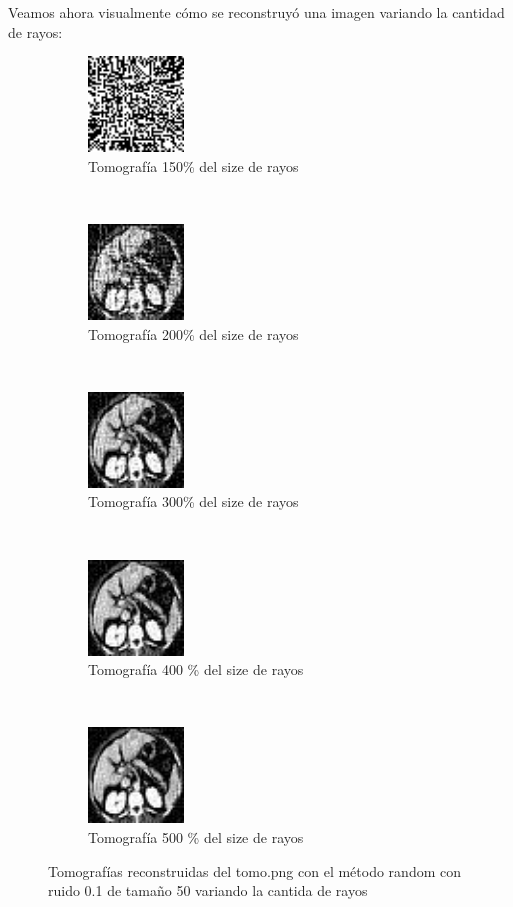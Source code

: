 Veamos ahora visualmente cómo se reconstruyó una imagen variando la cantidad de rayos:

\begin{figure}[H]
	\centering
    \begin{subfigure}[t]{0.3\textwidth}
        \centering
        \includegraphics[height=1.0in]{img/ray_n/1.png}
        \caption{Tomografía 150\% del size de rayos}
    \end{subfigure}
    ~ 
    \begin{subfigure}[t]{0.3\textwidth}
        \centering
        \includegraphics[height=1.0in]{img/ray_n/2.png}
        \caption{Tomografía 200\% del size de rayos}
	\label{tomo:2}
    \end{subfigure}
    ~ 
    \begin{subfigure}[t]{0.3\textwidth}
        \centering
        \includegraphics[height=1.0in]{img/ray_n/3.png}
        \caption{Tomografía 300\% del size de rayos}
    \end{subfigure}
    \\
    \begin{subfigure}[t]{0.3\textwidth}
        \centering
        \includegraphics[height=1.0in]{img/ray_n/4.png}
        \caption{Tomografía 400 \% del size de  rayos}
    \end{subfigure}
    ~ 
    \begin{subfigure}[t]{0.3\textwidth}
        \centering
        \includegraphics[height=1.0in]{img/ray_n/5.png}
        \caption{Tomografía 500 \% del size de rayos}
    \end{subfigure}
    \caption{Tomografías reconstruidas del tomo.png con el método random con ruido 0.1 de tamaño 50 variando la cantida de rayos}
	\label{fig:resultados-noise1}
\end{figure}

